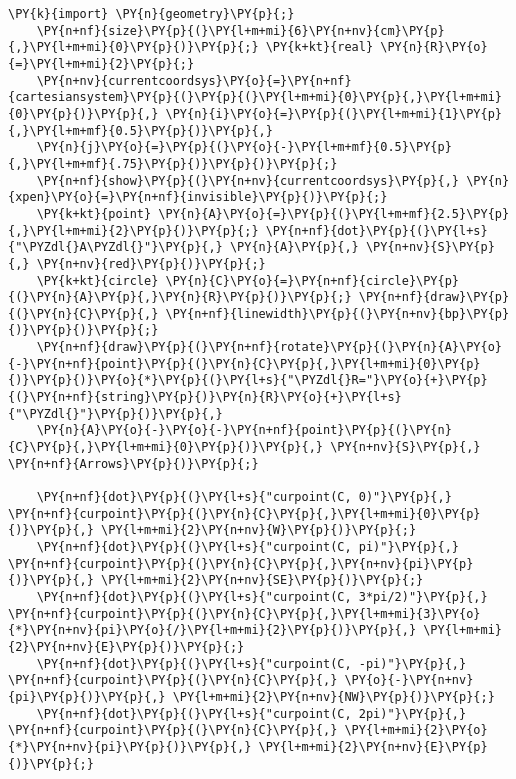 \begin{Verbatim}[commandchars=\\\{\}]
    \PY{k}{import} \PY{n}{geometry}\PY{p}{;}
    \PY{n+nf}{size}\PY{p}{(}\PY{l+m+mi}{6}\PY{n+nv}{cm}\PY{p}{,}\PY{l+m+mi}{0}\PY{p}{)}\PY{p}{;} \PY{k+kt}{real} \PY{n}{R}\PY{o}{=}\PY{l+m+mi}{2}\PY{p}{;}
    \PY{n+nv}{currentcoordsys}\PY{o}{=}\PY{n+nf}{cartesiansystem}\PY{p}{(}\PY{p}{(}\PY{l+m+mi}{0}\PY{p}{,}\PY{l+m+mi}{0}\PY{p}{)}\PY{p}{,} \PY{n}{i}\PY{o}{=}\PY{p}{(}\PY{l+m+mi}{1}\PY{p}{,}\PY{l+m+mf}{0.5}\PY{p}{)}\PY{p}{,}
    \PY{n}{j}\PY{o}{=}\PY{p}{(}\PY{o}{-}\PY{l+m+mf}{0.5}\PY{p}{,}\PY{l+m+mf}{.75}\PY{p}{)}\PY{p}{)}\PY{p}{;}
    \PY{n+nf}{show}\PY{p}{(}\PY{n+nv}{currentcoordsys}\PY{p}{,} \PY{n}{xpen}\PY{o}{=}\PY{n+nf}{invisible}\PY{p}{)}\PY{p}{;}
    \PY{k+kt}{point} \PY{n}{A}\PY{o}{=}\PY{p}{(}\PY{l+m+mf}{2.5}\PY{p}{,}\PY{l+m+mi}{2}\PY{p}{)}\PY{p}{;} \PY{n+nf}{dot}\PY{p}{(}\PY{l+s}{"\PYZdl{}A\PYZdl{}"}\PY{p}{,} \PY{n}{A}\PY{p}{,} \PY{n+nv}{S}\PY{p}{,} \PY{n+nv}{red}\PY{p}{)}\PY{p}{;}
    \PY{k+kt}{circle} \PY{n}{C}\PY{o}{=}\PY{n+nf}{circle}\PY{p}{(}\PY{n}{A}\PY{p}{,}\PY{n}{R}\PY{p}{)}\PY{p}{;} \PY{n+nf}{draw}\PY{p}{(}\PY{n}{C}\PY{p}{,} \PY{n+nf}{linewidth}\PY{p}{(}\PY{n+nv}{bp}\PY{p}{)}\PY{p}{)}\PY{p}{;}
    \PY{n+nf}{draw}\PY{p}{(}\PY{n+nf}{rotate}\PY{p}{(}\PY{n}{A}\PY{o}{-}\PY{n+nf}{point}\PY{p}{(}\PY{n}{C}\PY{p}{,}\PY{l+m+mi}{0}\PY{p}{)}\PY{p}{)}\PY{o}{*}\PY{p}{(}\PY{l+s}{"\PYZdl{}R="}\PY{o}{+}\PY{p}{(}\PY{n+nf}{string}\PY{p}{)}\PY{n}{R}\PY{o}{+}\PY{l+s}{"\PYZdl{}"}\PY{p}{)}\PY{p}{,}
    \PY{n}{A}\PY{o}{-}\PY{o}{-}\PY{n+nf}{point}\PY{p}{(}\PY{n}{C}\PY{p}{,}\PY{l+m+mi}{0}\PY{p}{)}\PY{p}{,} \PY{n+nv}{S}\PY{p}{,} \PY{n+nf}{Arrows}\PY{p}{)}\PY{p}{;}

    \PY{n+nf}{dot}\PY{p}{(}\PY{l+s}{"curpoint(C, 0)"}\PY{p}{,} \PY{n+nf}{curpoint}\PY{p}{(}\PY{n}{C}\PY{p}{,}\PY{l+m+mi}{0}\PY{p}{)}\PY{p}{,} \PY{l+m+mi}{2}\PY{n+nv}{W}\PY{p}{)}\PY{p}{;}
    \PY{n+nf}{dot}\PY{p}{(}\PY{l+s}{"curpoint(C, pi)"}\PY{p}{,} \PY{n+nf}{curpoint}\PY{p}{(}\PY{n}{C}\PY{p}{,}\PY{n+nv}{pi}\PY{p}{)}\PY{p}{,} \PY{l+m+mi}{2}\PY{n+nv}{SE}\PY{p}{)}\PY{p}{;}
    \PY{n+nf}{dot}\PY{p}{(}\PY{l+s}{"curpoint(C, 3*pi/2)"}\PY{p}{,} \PY{n+nf}{curpoint}\PY{p}{(}\PY{n}{C}\PY{p}{,}\PY{l+m+mi}{3}\PY{o}{*}\PY{n+nv}{pi}\PY{o}{/}\PY{l+m+mi}{2}\PY{p}{)}\PY{p}{,} \PY{l+m+mi}{2}\PY{n+nv}{E}\PY{p}{)}\PY{p}{;}
    \PY{n+nf}{dot}\PY{p}{(}\PY{l+s}{"curpoint(C, -pi)"}\PY{p}{,} \PY{n+nf}{curpoint}\PY{p}{(}\PY{n}{C}\PY{p}{,} \PY{o}{-}\PY{n+nv}{pi}\PY{p}{)}\PY{p}{,} \PY{l+m+mi}{2}\PY{n+nv}{NW}\PY{p}{)}\PY{p}{;}
    \PY{n+nf}{dot}\PY{p}{(}\PY{l+s}{"curpoint(C, 2pi)"}\PY{p}{,} \PY{n+nf}{curpoint}\PY{p}{(}\PY{n}{C}\PY{p}{,} \PY{l+m+mi}{2}\PY{o}{*}\PY{n+nv}{pi}\PY{p}{)}\PY{p}{,} \PY{l+m+mi}{2}\PY{n+nv}{E}\PY{p}{)}\PY{p}{;}
\end{Verbatim}
